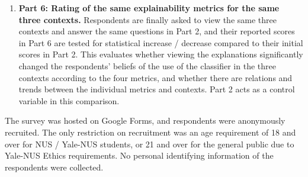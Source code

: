 \begin{enumerate}
	\item \textbf{Part 6: Rating of the same explainability metrics for the same three contexts.} Respondents are finally asked to view the same three contexts and answer the same questions in Part 2, and their reported scores in Part 6 are tested for statistical increase / decrease compared to their initial scores in Part 2. This evaluates whether viewing the explanations significantly changed the respondents' beliefs of the use of the classifier in the three contexts according to the four metrics, and whether there are relations and trends between the individual metrics and contexts. Part 2 acts as a control variable in this comparison.
\end{enumerate}

The survey was hosted on Google Forms, and respondents were anonymously recruited. The only restriction on recruitment was an age requirement of 18 and over for NUS / Yale-NUS students, or 21 and over for the general public due to Yale-NUS Ethics requirements. No personal identifying information of the respondents were collected.